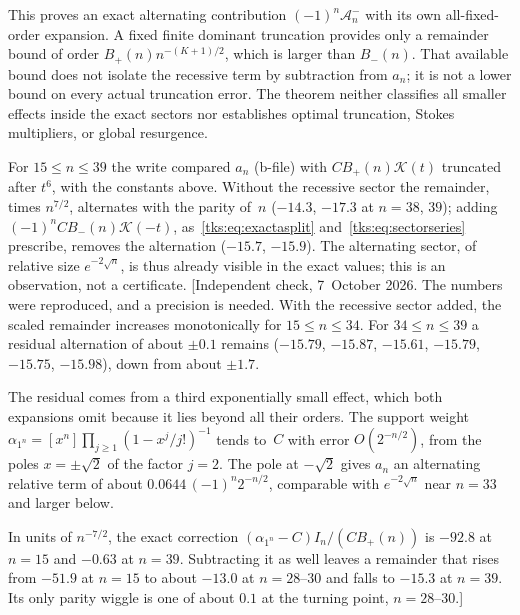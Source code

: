 This proves an exact alternating contribution $(-1)^n\mathcal A_n^-$ with its own all-fixed-order expansion. A fixed finite dominant truncation provides only a remainder bound of order $B_+(n)n^{-(K+1)/2}$, which is larger than $B_-(n)$. That available bound does not isolate the recessive term by subtraction from $a_n$; it is not a lower bound on every actual truncation error. The theorem neither classifies all smaller effects inside the exact sectors nor establishes optimal truncation, Stokes multipliers, or global resurgence.
\begin{writenote}
For $15\le n\le39$ the write compared $a_n$ (b-file) with $CB_+(n)\mathcal K(t)$
truncated after $t^6$, with the constants above. Without the recessive sector
the remainder, times $n^{7/2}$, alternates with the parity of~$n$ ($-14.3$,
$-17.3$ at $n=38$, $39$); adding
$(-1)^nCB_-(n)\mathcal K(-t)$, as~\eqref{tks:eq:exactasplit}
and~\eqref{tks:eq:sectorseries} prescribe, removes the alternation ($-15.7$,
$-15.9$). The alternating sector, of relative size $e^{-2\sqrt n}$, is thus
already visible in the exact values; this is an observation, not a
certificate.
[Independent check, 7~October 2026. The numbers were reproduced, and a
precision is needed. With the recessive sector added, the scaled remainder
increases monotonically for $15\le n\le34$. For $34\le n\le39$ a residual
alternation of about $\pm0.1$ remains ($-15.79$, $-15.87$, $-15.61$, $-15.79$,
$-15.75$, $-15.98$), down from about $\pm1.7$.

The residual comes from a third exponentially small effect, which both
expansions omit because it lies beyond all their orders. The support weight
$\alpha_{1^n}=[x^n]\prod_{j\ge1}(1-x^j/j!)^{-1}$ tends to~$C$ with error
$O(2^{-n/2})$, from the poles $x=\pm\sqrt2$ of the factor $j=2$. The pole at
$-\sqrt2$ gives $a_n$ an alternating relative term of about
$0.0644\,(-1)^n2^{-n/2}$, comparable with $e^{-2\sqrt n}$ near $n=33$ and
larger below.

In units of $n^{-7/2}$, the exact correction $(\alpha_{1^n}-C)I_n/(CB_+(n))$ is
$-92.8$ at $n=15$ and $-0.63$ at $n=39$. Subtracting it as well leaves a remainder
that rises from $-51.9$ at $n=15$ to about $-13.0$ at $n=28$--$30$ and falls to
$-15.3$ at $n=39$. Its only parity wiggle is one of about $0.1$ at the turning
point, $n=28$--$30$.]
\end{writenote}
